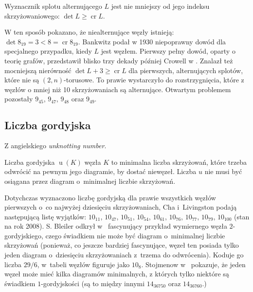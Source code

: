 \begin{proposition} \label{prp:bankwitz}
    Wyznacznik splotu alternującego $L$ jest nie mniejszy od jego indeksu skrzyżowaniowego: $\det L \ge \operatorname{cr} L$.
\end{proposition}

W ten sposób pokazano, że niealternujące węzły istnieją: $\det 8_{19} = 3 < 8 = \operatorname{cr} 8_{19}$.
Bankwitz podał w 1930 niepoprawny dowód dla specjalnego przypadku, kiedy $L$ jest węzłem.
Pierwszy pełny dowód, oparty o teorię grafów, przedstawił blisko trzy dekady później Crowell w \cite{crowell57}.
Znalazł też mocniejszą nierówność $\det L + 3 \ge \operatorname{cr} L$ dla pierwszych, alternujących splotów, które nie są $(2, n)$-torusowe.
To prawie wystarczyło do rozstrzygnięcia, które z węzłów o mniej niż 10 skrzyżowaniach są alternujące.
Otwartym problemem pozostały $9_{45}$, $9_{47}$, $9_{48}$ oraz $9_{49}$.


\subsection{Liczba gordyjska} %
\label{sub:unknotting_number}
Z angielskiego \emph{unknotting number}.

\begin{definition}
    Liczba gordyjska $\operatorname{u}(K)$ węzła $K$ to minimalna liczba skrzyżowań,
    które trzeba odwrócić na pewnym jego diagramie, by dostać niewęzeł.
    Liczba $u$ nie musi być osiągana przez diagram o~minimalnej liczbie skrzyżowań.
\end{definition}

Dotychczas wyznaczono liczbę gordyjską dla prawie wszystkich węzłów pierwszych o~co najwyżej dziesięciu skrzyżowaniach,
Cha i~Livingston podają następującą listę wyjątków:
$10_{11}$, $10_{47}$, $10_{51}$, $10_{54}$, $10_{61}$, $10_{76}$, $10_{77}$, $10_{79}$, $10_{100}$ (stan na rok 2008).
S. Bleiler odkrył w~\cite{bleiler84} fascynujący przykład wymiernego węzła $2$-gordyjskiego,
czego świadkiem nie może być diagram o~minimalnej liczbie skrzyżowań
(ponieważ, co jeszcze bardziej fascynujące, węzeł ten posiada tylko jeden diagram o~dziesięciu skrzyżowaniach z~trzema do odwrócenia).
Koduje go liczba $29/6$, w~tabeli węzłów figuruje jako $10_8$.
Stojmenow w~\cite{stoimenow01} pokazuje, że jeden węzeł może mieć kilka diagramów minimalnych,
z których tylko niektóre są świadkiem $1$-gordyjskości (są to między innymi $14_{36750}$ oraz $14_{36760}$.)

